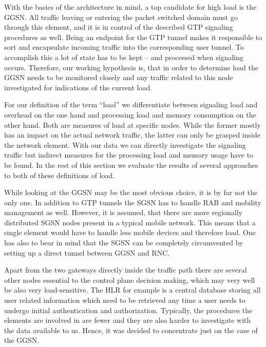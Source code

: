 With the basics of the architecture in mind, a top candidate for high load is the \ac{GGSN}. All traffic leaving or entering the packet switched domain must go through this element, and it is in control of the described GTP signaling procedures as well. Being an endpoint for the GTP tunnel makes it responsible to sort and encapsulate incoming traffic into the corresponding user tunnel. To accomplish this a lot of state has to be kept -- and processed when signaling occurs. Therefore, our working hypothesis is, that in order to determine load the \ac{GGSN} needs to be monitored closely and any traffic related to this node investigated for indications of the current load.

For our definition of the term ``load'' we differentiate between signaling load and overhead on the one hand and processing load and memory consumption on the other hand. Both are measures of load at specific nodes. While the former mostly has an impact on the actual network traffic, the latter can only be grasped inside the network element. With our data we can directly investigate the signaling traffic but indirect measures for the processing load and memory usage have to be found. In the rest of this section we evaluate the results of several approaches to both of these definitions of load.

While looking at the \ac{GGSN} may be the most obvious choice, it is by far not the only one. 
In addition to GTP tunnels the \ac{SGSN} has to handle \ac{RAB} and mobility management as well. However, it is assumed, that there are more regionally distributed \ac{SGSN} nodes present in a typical mobile network. This means that a single element would have to handle less mobile devices and therefore load. One has also to bear in mind that the \ac{SGSN} can be completely circumvented by setting up a direct tunnel between \ac{GGSN} and \ac{RNC}.

Apart from the two gateways directly inside the traffic path there are several other nodes essential to the control plane decision making, which may very well be also very load-sensitive. The \ac{HLR} for example is a central database storing all user related information which need to be retrieved any time a user needs to undergo initial authentication and authorization. Typically, the procedures the elements are involved in are fewer and they are also harder to investigate with the data available to us. Hence, it was decided to concentrate just on the case of the \ac{GGSN}.


